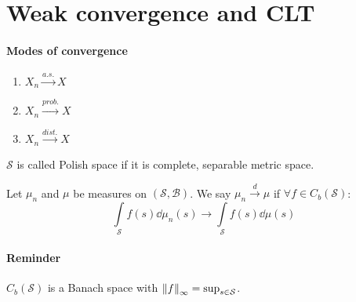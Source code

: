 \section{Weak convergence and CLT}
\paragraph{Modes of convergence}
\begin{enumerate}
	\item $X_n\stackrel{a.s.}{\to} X$
	\item $X_n\stackrel{prob.}{\to} X$
	\item $X_n\stackrel{dist.}{\to} X$
\end{enumerate}
\begin{definition}
	$\mathcal{S}$ is called Polish space if it is complete, separable metric space.
\end{definition}
\begin{definition}
	Let $\mu_n$ and $\mu$ be measures on $(\mathcal{S}, \mathcal{B})$. We say $\mu_n \stackrel{d}{\to} \mu$ if $\forall f \in C_b(\mathcal{S})$:
	$$\int\limits_{\mathcal{S}} f(s) \dd{\mu_n(s)} \to \int\limits_{\mathcal{S}} f(s) \dd{\mu(s)}$$
\end{definition}

\paragraph{Reminder}
$C_b(\mathcal{S})$ is a Banach space with $\norm{f}_\infty = \sup_{s\in \mathcal{S}}$.
